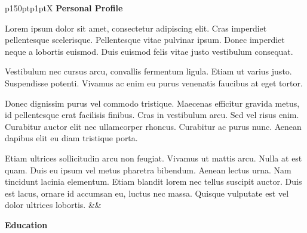 \documentclass[hidelinks, 12pt, a4paper]{article}
\begin{document}
	\noindent
	\begin{table}[h!]
		\begin{tabularx}{\textwidth}{p{150pt}p{1pt}X}
			{\noindent\Large\textbf{Personal Profile}}
			
			\vspace{4pt}
			
			 Lorem ipsum dolor sit amet, consectetur adipiscing elit. Cras imperdiet pellentesque scelerisque. Pellentesque vitae pulvinar ipsum. Donec imperdiet neque a lobortis euismod. Duis euismod felis vitae justo vestibulum consequat.\newline
			 
			 Vestibulum nec cursus arcu, convallis fermentum ligula. Etiam ut varius justo. Suspendisse potenti. Vivamus ac enim eu purus venenatis faucibus at eget tortor.\newline
			 
			 Donec dignissim purus vel commodo tristique. Maecenas efficitur gravida metus, id pellentesque erat facilisis finibus. Cras in vestibulum arcu. Sed vel risus enim. Curabitur auctor elit nec ullamcorper rhoncus. Curabitur ac purus nunc. Aenean dapibus elit eu diam tristique porta.\newline
			 
			 Etiam ultrices sollicitudin arcu non feugiat. Vivamus ut mattis arcu. Nulla at est quam. Duis eu ipsum vel metus pharetra bibendum. Aenean lectus urna. Nam tincidunt lacinia elementum. Etiam blandit lorem nec tellus suscipit auctor. Duis est lacus, ornare id accumsan eu, luctus nec massa. Quisque vulputate est vel dolor ultrices lobortis.
			&&
			
			\begin{minipage}[t]{\linewidth}
				
				{\noindent\hspace{3pt}\Large\textbf{Education}}
				

\end{minipage}
\end{tabularx}
\end{table}
\end{document}
